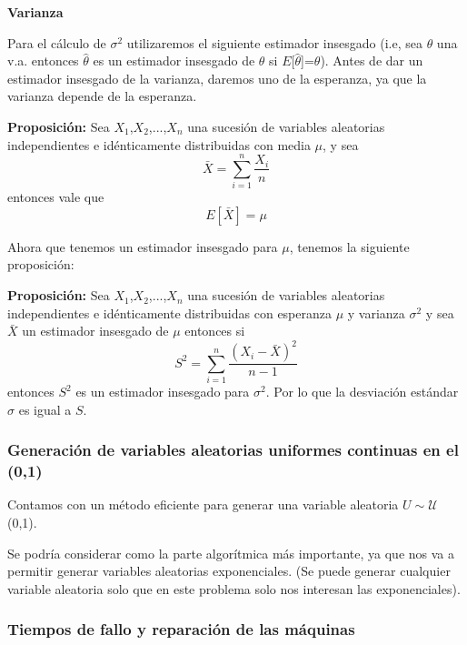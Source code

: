 \documentclass[12pt]{article}
\begin{document}
{\bf Varianza}
\vspace{0.15in}

Para el cálculo de $\sigma^2$ utilizaremos el siguiente estimador insesgado (i.e, sea $\theta$ una v.a. entonces $\hat{\theta}$
es un estimador insesgado de $\theta$ si $E$[$\hat{\theta}$]=$\theta$).
Antes de dar un estimador insesgado de la varianza, daremos uno de la esperanza, ya que la varianza depende de la esperanza.
\pagebreak

{\bf Proposición:} Sea $X_1$,$X_2$,...,$X_n$ una sucesión de variables aleatorias independientes
e idénticamente distribuidas con media $\mu$, y sea
\[\bar{X}=\sum\limits_{i=1}^n \frac{X_i}{n}\]
entonces vale que
\[E[\bar{X}]=\mu\]

\vspace{0.2in}

\noindent Ahora que tenemos un estimador insesgado para $\mu$, tenemos la siguiente proposición:

\vspace{0.2in}

{\bf Proposición:} Sea $X_1$,$X_2$,...,$X_n$ una sucesión de variables aleatorias independientes
e idénticamente distribuidas con esperanza $\mu$ y varianza $\sigma^2$ y sea $\bar{X}$ un estimador insesgado de $\mu$ entonces si
\[S^2=\sum\limits_{i=1}^n \frac{(X_i - \bar{X})^2}{n-1}\]
entonces $S^2$ es un estimador insesgado para $\sigma^2$.
Por lo que la desviación estándar $\sigma$ es igual a $S$.
\vspace{0.2in}

\subsubsection{Generación de variables aleatorias uniformes continuas en el (0,1)}

Contamos con un método eficiente para generar una variable aleatoria $U\sim \mathcal{U}$(0,1).


Se podría considerar como la parte algorítmica más importante, ya que nos va a permitir
generar variables aleatorias exponenciales. (Se puede generar cualquier variable aleatoria
solo que en este problema solo nos interesan las exponenciales).
\vspace{0.2in}

\subsubsection{Tiempos de fallo y reparación de las máquinas}
\end{document}

